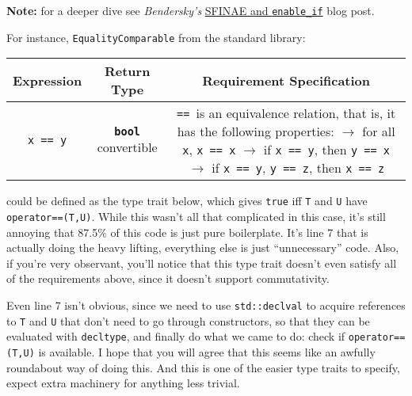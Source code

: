     \noindent \textbf{Note:} for a deeper dive see \emph{Bendersky's} \href{https://eli.thegreenplace.net/2014/sfinae-and-enable_if/}{SFINAE and \texttt{enable\_if}} blog post.

    For instance, \texttt{EqualityComparable} from the  standard library:

    \begin{table}[h]
    \begin{tabular}{ccc}
        \toprule
        \bf{Expression} & \bf{Return Type} & \bf{Requirement Specification} \\
        \midrule
        \texttt{x == y} & \textbf{\texttt{bool}} convertible & \makecell[l]{\texttt{==}\, is an equivalence relation, that is,\\
                                                                it has the following properties:\\
                                                                $\rightarrow$ for all \texttt{x}, \texttt{x == x}\\
                                                                $\rightarrow$ if \texttt{x == y}, then \texttt{y == x}\\
                                                                $\rightarrow$ if \texttt{x == y}, \texttt{y == z}, then \texttt{x == z}} \\
        \bottomrule
    \end{tabular}
    \end{table}

    \noindent could be defined as the type trait below, which gives \texttt{true} iff \texttt{T} and \texttt{U} have \texttt{operator==(T,U)}. While this wasn't all that complicated in this case, it's still annoying that 87.5\% of this code is just pure boilerplate. It's line 7 that is actually doing the heavy lifting, everything else is just ``unnecessary'' code. Also, if you're very observant, you'll notice that this type trait doesn't even satisfy all of the requirements above, since it doesn't support commutativity.

    Even line 7 isn't obvious, since we need to use \texttt{std::declval} to acquire references to \texttt{T} and \texttt{U} that don't need to go through constructors, so that they can be evaluated with \texttt{decltype}, and finally do what we came to do: check if \texttt{operator==(T,U)} is available. I hope that you will agree that this seems like an awfully roundabout way of doing this. And this is one of the easier type traits to specify, expect extra machinery for anything less trivial.

